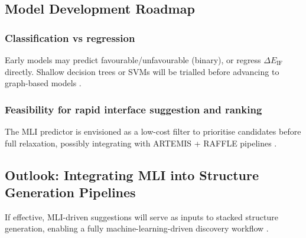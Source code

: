\subsection{Model Development Roadmap}

\subsubsection{Classification vs regression}

Early models may predict favourable/unfavourable (binary), or regress $\Delta E_\mathrm{IF}$ directly. Shallow decision trees or SVMs will be trialled before advancing to graph-based models .

\subsubsection{Feasibility for rapid interface suggestion and ranking}

The MLI predictor is envisioned as a low-cost filter to prioritise candidates before full relaxation, possibly integrating with ARTEMIS + RAFFLE pipelines .

\subsection{Outlook: Integrating MLI into Structure Generation Pipelines}

If effective, MLI-driven suggestions will serve as inputs to stacked structure generation, enabling a fully machine-learning-driven discovery workflow .

